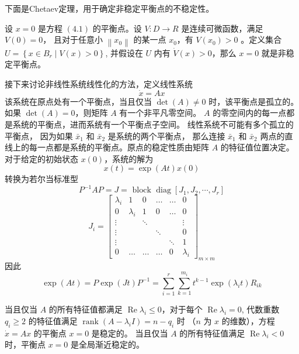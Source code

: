 下面是Chetaev定理，用于确定非稳定平衡点的不稳定性。
\begin{theorem}
    设 $x=0$ 是方程 $(4.1)$ 的平衡点。设 $V: D \rightarrow R$ 是连续可微函数，满足 $V(0)=0$，
    且对于任意小 $\left\|x_0\right\|$ 的某一点 $x_0$，有 $V\left(x_0\right)>0$ 。定义集合 $U=\left\{x \in B_r \mid V(x)>0\right\}$,
    并假设在 $U$ 内有 $\dot{V}(x)>0$，那么 $x=0$ 就是非稳定平衡点。
\end{theorem}
接下来讨论非线性系统线性化的方法，定义线性系统
\begin{equation}
    \dot{x}=A x
\end{equation}
该系统在原点处有一个平衡点，当且仅当 $\operatorname{det}(A) \neq 0$ 时，该平衡点是孤立的。
如果 $\operatorname{det}(A)=0$，则矩阵 $A$ 有一个非平凡零空间。 $A$ 的零空间内的每一点都是系统的平衡点，进而系统有一个平衡点子空间。
线性系统不可能有多个孤立的平衡点， 因为如果 $\bar{x}_1$ 和 $\bar{x}_2$ 是系统的两个平衡点， 那么连接 $\bar{x}_1$ 和 $\bar{x}_2$ 
两点的直线上的每一点都是系统的平衡点。原点的稳定性质由矩阵 $A$ 的特征值位置决定。对于给定的初始状态 $x(0)$，系统的解为
\begin{equation}
    x(t)=\exp (A t) x(0)
\end{equation}
转换为若尔当标准型
\begin{equation}
    P^{-1} A P=J=\text { block } \operatorname{diag}\left[J_1,J_2,\cdots,J_r\right]
\end{equation}
\begin{equation}
    J_i=\left[\begin{array}{cccccc}
    \lambda_i & 1 & 0 & \ldots & \ldots & 0 \\
    0 & \lambda_i & 1 & 0 & \ldots & 0 \\
    \vdots & & \ddots & & & \vdots \\
    \vdots & & & \ddots & & 0 \\
    \vdots & & & & \ddots & 1 \\
    0 & \ldots & \ldots & \ldots & 0 & \lambda_i
    \end{array}\right]_{m \times m}
\end{equation}
因此
\begin{equation}
    \exp (A t)=P \exp (J t) P^{-1}=\sum_{i=1}^r \sum_{k=1}^{m_i} t^{k-1} \exp \left(\lambda_i t\right) R_{i k}
\end{equation}
\begin{theorem}
    当且仅当 $A$ 的所有特征值都满足 $\operatorname{Re} \lambda_i \leqslant 0$，对于每个 $\operatorname{Re} \lambda_i=0$,
    代数重数 $q_i \geqslant 2$ 的特征值满足 $\operatorname{rank}\left(A-\lambda_i I\right)=n-q_i$ 时
    （$n$ 为 $x$ 的维数），方程 $\dot{x}=A x$ 的平衡点 $x=0$ 是稳定的。 
    当且仅当 $A$ 的所有特征值满足 $\operatorname{Re} \lambda_i<0$ 时，平衡点 $x=0$ 是全局渐近稳定的。
\end{theorem}
